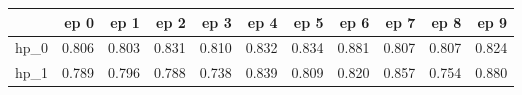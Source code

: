 \begin{tabular}{lrrrrrrrrrr}
\toprule
{} &   ep 0 &   ep 1 &   ep 2 &   ep 3 &   ep 4 &   ep 5 &   ep 6 &   ep 7 &   ep 8 &   ep 9 \\
\midrule
hp\_0 &  0.806 &  0.803 &  0.831 &  0.810 &  0.832 &  0.834 &  0.881 &  0.807 &  0.807 &  0.824 \\
hp\_1 &  0.789 &  0.796 &  0.788 &  0.738 &  0.839 &  0.809 &  0.820 &  0.857 &  0.754 &  0.880 \\
\bottomrule
\end{tabular}
